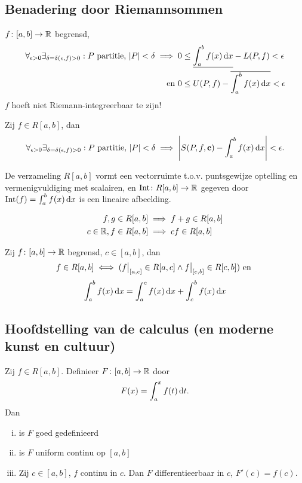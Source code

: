\documentclass{2wa40summary}
\begin{document}
		\subsection{Benadering door Riemannsommen}
			\begin{theorem}
				$ f\colon [a,b] \to \mathbb{R}  $ begrensd,
				\begin{align*}
					\forall_{\epsilon >0} \exists_{\delta = \delta (\epsilon,f)>0}: P \text{ partitie, } \abs{P}<\delta \implies 0 &\le \ul{\int_a^b f(x) \d x} - L(P,f) < \epsilon  \\
					\text{ en }0 &\le U(P,f) - \overline{\int_a^b f(x)\d x} <\epsilon
				 \end{align*}
				 \opm $f$ hoeft niet Riemann-integreerbaar te zijn!
			\end{theorem}
			\begin{theorem}
				Zij $ f \in R[a,b] $, dan
				\[ 
					\forall_{\epsilon >0} \exists_{\delta = \delta (\epsilon,f)>0}: P \text{ partitie, } \abs{P}<\delta \implies \abs{S(P,f,\c) - \int_a^b f(x) \d x} < \epsilon.
				 \]
			\end{theorem}
			\begin{theorem}[\text{[K]} 6.3.1]
				De verzameling $R[a,b]$ vormt een vectorruimte t.o.v. puntsgewijze optelling en vermenigvuldiging met scalairen, en $ \mathrm{Int}\colon  R[a,b] \to \mathbb{R} $ gegeven door $ \mathrm{Int}(f) = \int_a^b f(x)\mathop{}\!\mathrm{d} x $ is een lineaire afbeelding.
				\begin{gevolg}
					\begin{align*}
						f,g \in R[a,b] &\implies f+g \in R[a,b] \\
						c \in \mathbb{R}, f\in R[a,b] &\implies cf \in R[a,b]
					 \end{align*}
				\end{gevolg}
			\end{theorem}
			\begin{theorem}
				Zij $f\colon [a,b] \to \mathbb{R}$ begrensd, $c\in [a,b]$, dan
				\[ 
					f \in R[a,b] \iff (\restr{f}{[a,c]} \in R[a,c] \wedge \restr{f}{[c,b]} \in R[c,b]) \text{ en }
				 \]
				 \[ 
					 \int_a^b f(x)\mathop{}\!\mathrm{d} x = \int_a^c f(x) \mathop{}\!\mathrm{d} x + \int_c^b f(x) \mathop{}\!\mathrm{d} x
				  \]
			\end{theorem}
			
		\subsection{Hoofdstelling van de calculus (en moderne kunst en cultuur)}
			\begin{theorem}
				Zij $f \in R[a,b]$. Definieer $ F\colon [a,b] \to \mathbb{R} $ door 
				\[ 
					F(x)=\int_a^x f(t)\mathop{}\!\mathrm{d} t.
				 \]
				 Dan
				 \begin{enumerate}[(i)]
				 	\item is $F$ goed gedefinieerd
				 	\item is $F$ uniform continu op $ [a,b] $
				 	\item Zij $ c \in [a,b] $, $f$ continu in $c$. Dan $F$ differentieerbaar in $c$, $ F'(c)=f(c) $.
				 \end{enumerate}
			\end{theorem}
			
\end{document}
